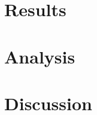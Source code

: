 \documentclass[10pt,oneside,a4paper, english]{article}
\begin{document}
\newpage
\section{Results} \label{results}


\newpage
\section{Analysis} \label{analysis}
 

\vspace{0.5cm}
\section{Discussion} \label{discussion}
 


%  

\label{EndOfText}

\newpage
{} 




\newpage
{}
 



\label{endOfDoc}
\end{document}
